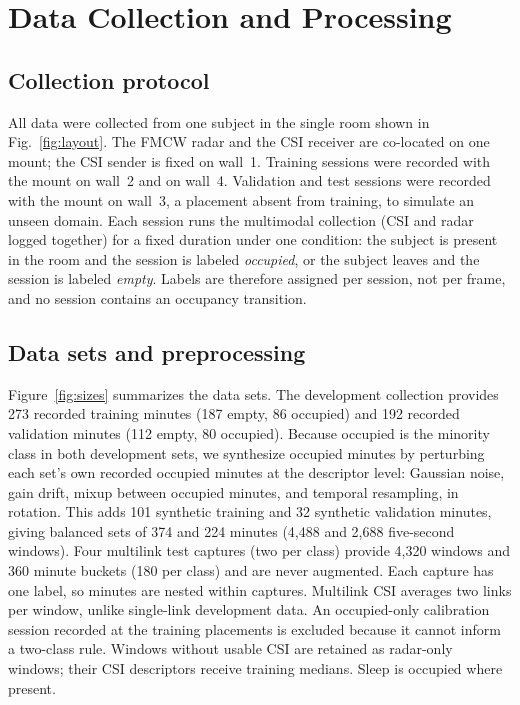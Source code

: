 \documentclass[conference,10pt,letterpaper]{IEEEtran}
\begin{document}
\section{Data Collection and Processing}
\subsection{Collection protocol}
All data were collected from one subject in the single room shown in Fig.~\ref{fig:layout}. The FMCW radar and the CSI receiver are co-located on one mount; the CSI sender is fixed on wall~1. Training sessions were recorded with the mount on wall~2 and on wall~4. Validation and test sessions were recorded with the mount on wall~3, a placement absent from training, to simulate an unseen domain. Each session runs the multimodal collection (CSI and radar logged together) for a fixed duration under one condition: the subject is present in the room and the session is labeled \emph{occupied}, or the subject leaves and the session is labeled \emph{empty}. Labels are therefore assigned per session, not per frame, and no session contains an occupancy transition.

\subsection{Data sets and preprocessing}
Figure~\ref{fig:sizes} summarizes the data sets. The development collection provides 273 recorded training minutes (187 empty, 86 occupied) and 192 recorded validation minutes (112 empty, 80 occupied). Because occupied is the minority class in both development sets, we synthesize occupied minutes by perturbing each set's own recorded occupied minutes at the descriptor level: Gaussian noise, gain drift, mixup between occupied minutes, and temporal resampling, in rotation. This adds 101 synthetic training and 32 synthetic validation minutes, giving balanced sets of 374 and 224 minutes (4,488 and 2,688 five-second windows). Four multilink test captures (two per class) provide 4,320 windows and 360 minute buckets (180 per class) and are never augmented. Each capture has one label, so minutes are nested within captures. Multilink CSI averages two links per window, unlike single-link development data. An occupied-only calibration session recorded at the training placements is excluded because it cannot inform a two-class rule. Windows without usable CSI are retained as radar-only windows; their CSI descriptors receive training medians. Sleep is occupied where present.
\end{document}
